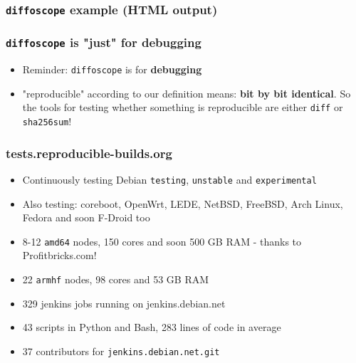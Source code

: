 \documentclass[14pt,aspectratio=169]{beamer}
\newif\ifplacelogo
\begin{document}
{\begin{frame}
 \frametitle{\texttt{diffoscope} example (HTML output)}
\end{frame}


\begin{frame}
 \frametitle{\texttt{diffoscope} is "just" for debugging}

 \begin{itemize}
  \item Reminder: \texttt{diffoscope} is for \textbf{debugging}
  \item "reproducible" according to our definition means: \textbf{bit by bit
  identical}. So the tools for testing whether something is reproducible are
  either \texttt{diff} or \texttt{sha256sum}!
 \end{itemize}
\end{frame}

}

\placelogotrue


\begin{frame}
 \frametitle{tests.reproducible-builds.org}

 \begin{itemize}
  \item Continuously testing Debian \texttt{testing}, \texttt{unstable} and
  \texttt{experimental}
  \item Also testing: coreboot, OpenWrt, LEDE, NetBSD, FreeBSD,
  Arch Linux, Fedora and soon F-Droid too
  \item 8-12 \texttt{amd64} nodes, 150 cores and soon 500 GB RAM - thanks to
  Profitbricks.com!
  \item 22 \texttt{armhf} nodes, 98 cores and 53 GB RAM
  \item 329 jenkins jobs running on jenkins.debian.net
  \item 43 scripts in Python and Bash, 283 lines of code in average
  \item 37 contributors for \texttt{jenkins.debian.net.git}
 \end{itemize}
\end{frame}
\end{document}
